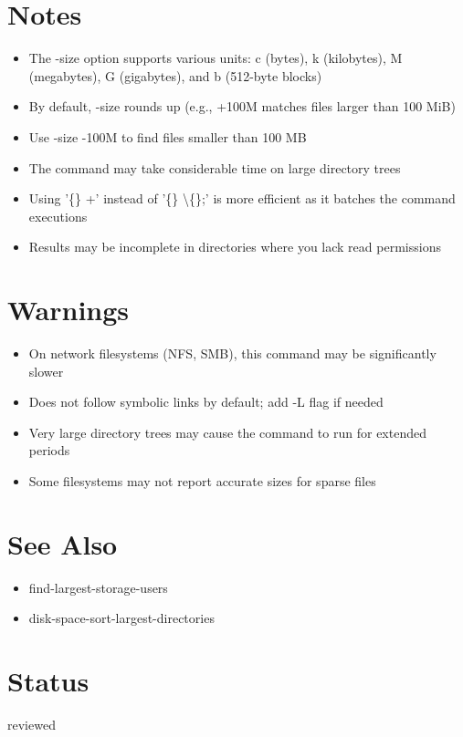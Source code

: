 \documentclass{article}
\begin{document}
\section*{Notes}
\begin{itemize}
  \item The -size option supports various units: c (bytes), k (kilobytes), M (megabytes), G (gigabytes), and b (512-byte blocks)
  \item By default, -size rounds up (e.g., +100M matches files larger than 100 MiB)
  \item Use -size -100M to find files smaller than 100 MB
  \item The command may take considerable time on large directory trees
  \item Using '\{\}  +' instead of '\{\}  \textbackslash\{\};' is more efficient as it batches the command executions
  \item Results may be incomplete in directories where you lack read permissions
\end{itemize}

\section*{Warnings}
\begin{itemize}
  \item On network filesystems (NFS, SMB), this command may be significantly slower
  \item Does not follow symbolic links by default; add -L flag if needed
  \item Very large directory trees may cause the command to run for extended periods
  \item Some filesystems may not report accurate sizes for sparse files
\end{itemize}

\section*{See Also}
\begin{itemize}
  \item find-largest-storage-users
  \item disk-space-sort-largest-directories
\end{itemize}

\section*{Status}
reviewed
\end{document}
